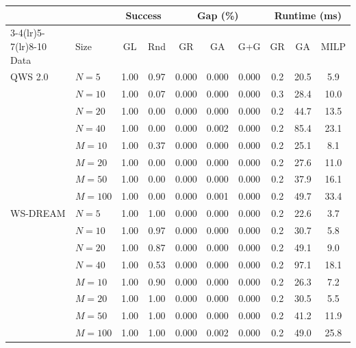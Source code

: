 \begin{tabular}{llcccccccc}
\toprule
 & & \multicolumn{2}{c}{Success} & \multicolumn{3}{c}{Gap (\%)} & \multicolumn{3}{c}{Runtime (ms)} \\
\cmidrule(lr){3-4}\cmidrule(lr){5-7}\cmidrule(lr){8-10}
Data & Size & GL & Rnd & GR & GA & G+G & GR & GA & MILP \\
\midrule
QWS 2.0 & $N=5$ & 1.00 & 0.97 & 0.000 & 0.000 & 0.000 & 0.2 & 20.5 & 5.9 \\
 & $N=10$ & 1.00 & 0.07 & 0.000 & 0.000 & 0.000 & 0.3 & 28.4 & 10.0 \\
 & $N=20$ & 1.00 & 0.00 & 0.000 & 0.000 & 0.000 & 0.2 & 44.7 & 13.5 \\
 & $N=40$ & 1.00 & 0.00 & 0.000 & 0.002 & 0.000 & 0.2 & 85.4 & 23.1 \\
 & $M=10$ & 1.00 & 0.37 & 0.000 & 0.000 & 0.000 & 0.2 & 25.1 & 8.1 \\
 & $M=20$ & 1.00 & 0.00 & 0.000 & 0.000 & 0.000 & 0.2 & 27.6 & 11.0 \\
 & $M=50$ & 1.00 & 0.00 & 0.000 & 0.000 & 0.000 & 0.2 & 37.9 & 16.1 \\
 & $M=100$ & 1.00 & 0.00 & 0.000 & 0.001 & 0.000 & 0.2 & 49.7 & 33.4 \\
\midrule
WS-DREAM & $N=5$ & 1.00 & 1.00 & 0.000 & 0.000 & 0.000 & 0.2 & 22.6 & 3.7 \\
 & $N=10$ & 1.00 & 0.97 & 0.000 & 0.000 & 0.000 & 0.2 & 30.7 & 5.8 \\
 & $N=20$ & 1.00 & 0.87 & 0.000 & 0.000 & 0.000 & 0.2 & 49.1 & 9.0 \\
 & $N=40$ & 1.00 & 0.53 & 0.000 & 0.000 & 0.000 & 0.2 & 97.1 & 18.1 \\
 & $M=10$ & 1.00 & 0.90 & 0.000 & 0.000 & 0.000 & 0.2 & 26.3 & 7.2 \\
 & $M=20$ & 1.00 & 1.00 & 0.000 & 0.000 & 0.000 & 0.2 & 30.5 & 5.5 \\
 & $M=50$ & 1.00 & 1.00 & 0.000 & 0.000 & 0.000 & 0.2 & 41.2 & 11.9 \\
 & $M=100$ & 1.00 & 1.00 & 0.000 & 0.002 & 0.000 & 0.2 & 49.0 & 25.8 \\
\bottomrule
\end{tabular}
